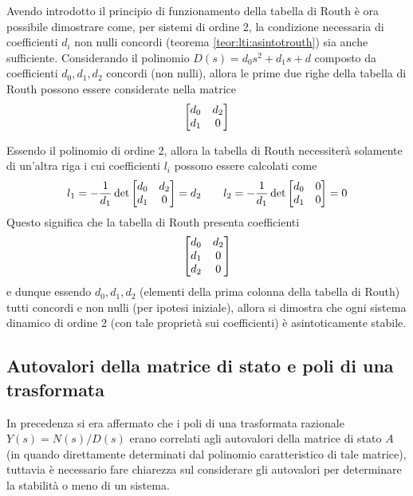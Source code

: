 		\begin{dimostrazione}
			Avendo introdotto il principio di funzionamento della tabella di Routh è ora possibile dimostrare come, per sistemi di ordine 2, la condizione necessaria di coefficienti $d_i$ non nulli concordi (teorema \ref{teor:lti:asintotrouth}) sia anche sufficiente. Considerando il polinomio $D(s) = d_0s^2 + d_1s + d$ composto da coefficienti $d_0,d_1,d_2$ concordi (non nulli), allora le prime due righe della tabella di Routh possono essere considerate nella matrice
			\[ \begin{bmatrix} d_0 & d_2 \\ d_1 & 0 \end{bmatrix} \]
			
			Essendo il polinomio di ordine 2, allora la tabella di Routh necessiterà solamente di un'altra riga i cui coefficienti $l_i$ possono essere calcolati come
			\[ l_1 = - \frac 1 {d_1}\det \begin{bmatrix} d_0 & d_2 \\ d_1 & 0 \end{bmatrix} = d_2 \qquad l_2 = - \frac 1 {d_1}\det \begin{bmatrix} d_0 & 0 \\ d_1 & 0 \end{bmatrix} = 0 \]
			Questo significa che la tabella di Routh presenta coefficienti
			\[ \begin{bmatrix} d_0 & d_2 \\ d_1 & 0 \\ d_2 & 0 \end{bmatrix} \]
			e dunque essendo $d_0,d_1,d_2$ (elementi della prima colonna della tabella di Routh) tutti concordi e non nulli (per ipotesi iniziale), allora si dimostra che ogni sistema dinamico di ordine 2 (con tale proprietà sui coefficienti) è asintoticamente stabile.
		
		\end{dimostrazione}

	\subsection{Autovalori della matrice di stato e poli di una trasformata}
		In precedenza si era affermato che i poli di una trasformata razionale $Y(s) = N(s)/D(s)$ erano  correlati agli autovalori della matrice di stato $A$ (in quando direttamente determinati dal polinomio caratteristico di tale matrice), tuttavia è necessario fare chiarezza sul considerare gli autovalori per determinare la stabilità o meno di un sistema.
		
